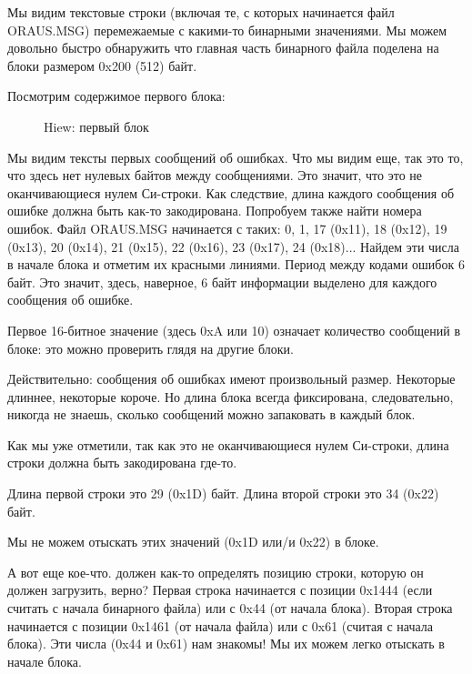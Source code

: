 Мы видим текстовые строки (включая те, с которых начинается файл ORAUS.MSG) перемежаемые с какими-то
бинарными значениями.
Мы можем довольно быстро обнаружить что главная часть бинарного файла поделена на блоки размером 0x200 (512) байт.

\clearpage
Посмотрим содержимое первого блока:

\begin{figure}[H]
\centering
{}
\caption{Hiew: первый блок}
\label{fig:oracle_MSB_2}
\end{figure}

Мы видим тексты первых сообщений об ошибках.
Что мы видим еще, так это то, что здесь нет нулевых байтов между сообщениями.
Это значит, что это не оканчивающиеся нулем Си-строки.
Как следствие, длина каждого сообщения об ошибке должна быть как-то закодирована.
Попробуем также найти номера ошибок.
Файл ORAUS.MSG начинается с таких: 
0, 1, 17 (0x11), 18 (0x12), 19 (0x13), 20 (0x14), 21 (0x15), 22 (0x16), 23 (0x17), 24 (0x18)...
Найдем эти числа в начале блока и отметим их красными линиями.
Период между кодами ошибок 6 байт.
Это значит, здесь, наверное, 6 байт информации выделено для каждого сообщения об ошибке.

Первое 16-битное значение (здесь 0xA или 10) означает количество сообщений в блоке: это можно проверить глядя на другие блоки.

Действительно: сообщения об ошибках имеют произвольный размер. 
Некоторые длиннее, некоторые короче. 
Но длина блока всегда фиксирована, следовательно, никогда не знаешь, сколько сообщений можно запаковать
в каждый блок.

Как мы уже отметили, так как это не оканчивающиеся нулем Си-строки, длина строки должна быть закодирована где-то.%

Длина первой строки  это 
29 (0x1D) байт.
Длина второй строки  
это 34 (0x22) байт.

Мы не можем отыскать этих значений (0x1D или/и 0x22) в блоке.

А вот еще кое-что.
\oracle должен как-то определять позицию строки, которую он должен загрузить, верно?
Первая строка  начинается с позиции 0x1444 (если считать с начала бинарного файла) или с 0x44 (от начала блока).
Вторая строка  
начинается с позиции 0x1461 (от начала файла) или с 0x61 (считая с начала блока).
Эти числа (0x44 и 0x61) нам знакомы! 
Мы их можем легко отыскать в начале блока.

